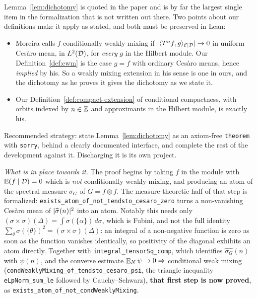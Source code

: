 \begin{remark}
  Lemma~\ref{lem:dichotomy} is quoted in the paper and is by far the largest single item in the
  formalization that is not written out there.  Two points about our definitions make it apply
  as stated, and both must be preserved in Lean:
  \begin{itemize}
    \item Moreira calls $f$ conditionally weakly mixing if $\lvert \langle T^n f, g \rangle_{\mathcal{E} \mid \mathcal{D}} \rvert \to 0$ in
      uniform Ces\`aro mean, in $L^2(\mathcal{D})$, for \emph{every} $g$ in the Hilbert module.  Our
      Definition~\ref{def:cwm} is the case $g=f$ with ordinary Ces\`aro means, hence
      \emph{implied} by his.  So a weakly mixing extension in his sense is one in ours, and the
      dichotomy as he proves it gives the dichotomy as we state it.
    \item Our Definition~\ref{def:compact-extension} of conditional compactness, with orbits
      indexed by $n \in \mathbb{Z}$ and approximants in the Hilbert module, is exactly his.
  \end{itemize}
  Recommended strategy: state Lemma~\ref{lem:dichotomy} as an axiom-free \texttt{theorem} with
  \texttt{sorry}, behind a clearly documented interface, and complete the rest of the development
  against it.  Discharging it is its own project.

  \smallskip
  \emph{What is in place towards it.}  The proof begins by taking $f$ in the module with
  $\mathbb{E}(f\mid\mathcal{D})=0$ which is \emph{not} conditionally weakly mixing, and producing an atom of
  the spectral measure $\sigma_G$ of $G = f \otimes f$.  The measure-theoretic half of that step
  is formalized: \texttt{exists\_atom\_of\_not\_tendsto\_cesaro\_zero} turns a non-vanishing
  Ces\`aro mean of $\lvert \widehat{\sigma}(n) \rvert ^2$ into an atom.  Notably this needs only
  $(\sigma\times\sigma)(\Delta) = \int \sigma(\{\alpha\})\,d\sigma$, which is Fubini, and not the
  full identity $\sum_\theta \sigma(\{\theta\}) ^2 = (\sigma\times\sigma)(\Delta)$: an integral of
  a non-negative function is zero as soon as the function vanishes identically, so positivity of
  the diagonal exhibits an atom directly.  Together with \texttt{integral\_tensorSq\_comp}, which identifies $\widehat{\sigma_G}(n)$ with
  $\psi(n)$, and the converse estimate
  $\mathop{\mathbb{E}}_{N}\psi \to 0 \Rightarrow$ conditional weak mixing
  (\texttt{condWeaklyMixing\_of\_tendsto\_cesaro\_psi}, the triangle inequality
  \texttt{eLpNorm\_sum\_le} followed by Cauchy--Schwarz), \textbf{that first step is now
  proved}, as \texttt{exists\_atom\_of\_not\_condWeaklyMixing}.


\end{remark}

